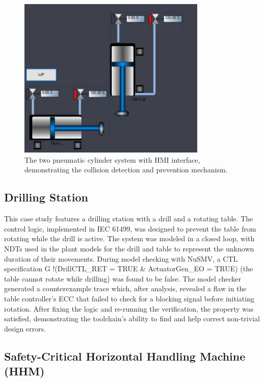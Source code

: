 \begin{figure}[h]
\centering
\includegraphics[width=0.8\textwidth]{MX_Papers/Paper3/pic/2cylindre_hmi.JPG}
\caption{The two pneumatic cylinder system with HMI interface, demonstrating the collision detection and prevention mechanism.}
\label{fig:two_cylinders}
\end{figure}

\subsection{Drilling Station}

This case study features a drilling station with a drill and a rotating table. The control logic, implemented in IEC 61499, was designed to prevent the table from rotating while the drill is active. The system was modeled in a closed loop, with NDTs used in the plant models for the drill and table to represent the unknown duration of their movements. During model checking with NuSMV, a CTL specification G !(DrillCTL\_RET = TRUE \& ActuatorGen\_EO = TRUE) (the table cannot rotate while drilling) was found to be false. The model checker generated a counterexample trace which, after analysis, revealed a flaw in the table controller's ECC that failed to check for a blocking signal before initiating rotation. After fixing the logic and re-running the verification, the property was satisfied, demonstrating the toolchain's ability to find and help correct non-trivial design errors.

\subsection{Safety-Critical Horizontal Handling Machine (HHM)}

